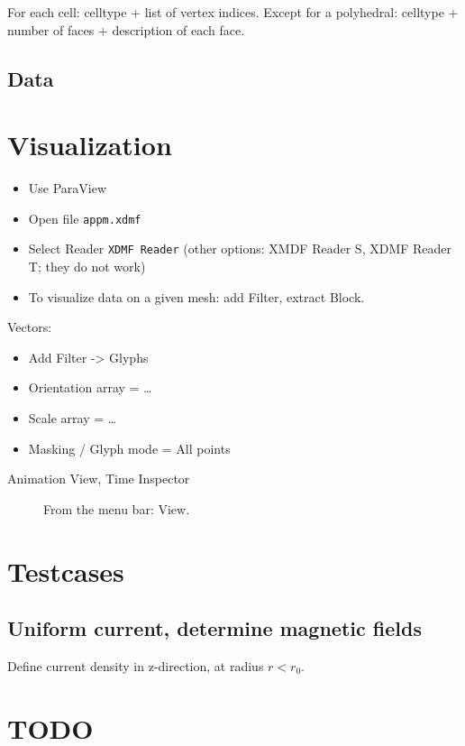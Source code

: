 \documentclass{article}
\begin{document}
For each cell: celltype + list of vertex indices. Except for a polyhedral: celltype + number of faces + description of each face.




\subsection{Data}


\section{Visualization}

\begin{itemize}
\item Use ParaView
\item Open file \texttt{appm.xdmf}
\item Select Reader \texttt{XDMF Reader} (other options: XMDF Reader S, XDMF Reader T; they do not work)

\item To visualize data on a given mesh: add Filter, extract Block.
\end{itemize}


Vectors:

\begin{itemize}
\item Add Filter -> Glyphs
\item Orientation array = \ldots
\item Scale array = \ldots
\item Masking / Glyph mode = All points
\end{itemize}

\begin{description}
\item[Animation View, Time Inspector]
From the menu bar: View. 
\end{description}



\section{Testcases}


\subsection{Uniform current, determine magnetic fields}

Define current density in z-direction, at radius $r < r_0$. 





\section{TODO}


\end{document}

